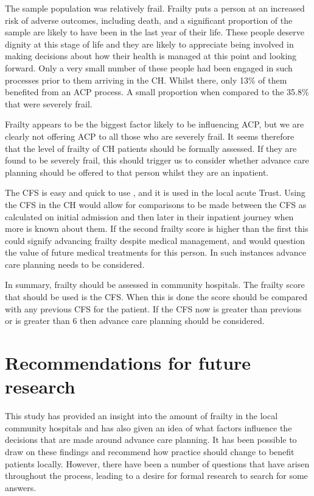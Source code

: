 \documentclass
[
	12pt,
	a4paper,
	oneside,
]{report}
\begin{document}
The sample population was relatively frail. Frailty puts a person at an 
increased risk of adverse outcomes, including death, and a significant
proportion of the sample are likely to have been in the last year of their life.
These people deserve dignity at this stage of life and they are likely
to appreciate being involved in making decisions about how their health is
managed at this point and looking forward. Only a very small number of these 
people had been engaged in such processes prior to them arriving in the CH.
Whilst there, only 13\% of them benefited from an ACP process. A small 
proportion when compared to the 35.8\% that were severely frail.

Frailty 
appears to be the biggest factor likely to be influencing ACP, but we are 
clearly
not offering ACP to all those who are severely frail. It seems therefore that
the level of frailty of CH patients should be formally assessed. If they 
are found 
to be severely frail, this should trigger us to consider whether advance 
care planning should be offered to that person whilst they are an inpatient.

The CFS is easy and quick to use \parencite{elliott:17}, and it is used in the 
local acute Trust. 
Using the CFS in the CH would allow for comparisons to be made between the CFS 
as calculated on initial admission and then later in their inpatient journey
when more is known about them. If the second frailty score is higher than the
first this could signify advancing frailty despite medical management, 
and would question the value of future medical treatments for this person.
In such instances advance care planning needs to be considered. 

In summary, frailty should be assessed in community hospitals. The frailty score
that should be used is the CFS. When this is done the score should be compared
with any previous CFS for the patient. If the CFS now is greater than previous
or is greater than 6 then advance care planning should be considered.

\section{Recommendations for future research}

This study has provided an insight into the amount of frailty in the local
community hospitals and has also given an idea of what factors influence the 
decisions that are made around advance care planning. It has been possible to
draw on these findings and recommend how practice should change to benefit
patients locally. However, there have been a number of questions that have 
arisen throughout the process, leading to a desire for formal research to 
search for some answers. 
\end{document}
